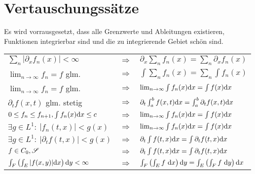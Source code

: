 \section{Vertauschungssätze}



Es wird vorrausgesetzt, dass alle Grenzwerte und Ableitungen existieren, Funktionen integrierbar sind und die zu integrierende Gebiet schön sind.
\begin{adjustbox}{angle=0}
  \fontsize{8}{10}\selectfont
  \centering
  \begin{tabular}{lcl}
     $\sum_n |\partial_x f_n(x)| < \infty$ & $\Rightarrow$ & $\partial_x \sum_n f_n(x) = \sum_n \partial_x f_n(x)$\\
     $\lim_{n\rightarrow\infty} f_n = f$ glm. & $\Rightarrow$ & $\int \sum_n f_n(x) = \sum_n \int f_n(x)$\\
     $\lim_{n\rightarrow\infty} f_n = f$ glm. & $\Rightarrow$ & $\lim_{n\rightarrow\infty}\int f_n(x)\mathrm{d}x = \int f(x)\mathrm{d}x$ \\
     $\partial_tf(x,t)$ glm. stetig & $\Rightarrow$ & $\partial_t\int_a^b f(x,t)\mathrm{d}x = \int_a^b \partial_t f(x,t)\mathrm{d}x$\\
     $0\leq f_n\leq f_{n+1}, \int f_n(x)\mathrm{d}x \leq c$ & $\Rightarrow$ & $\lim_{n\rightarrow\infty} \int f_n(x)\mathrm{d}x = \int f(x)\mathrm{d}x$ \\
     $\exists g\in L^1:\ |f_n(t,x)| < g(x)$ & $\Rightarrow$ & $\lim_{n\rightarrow\infty} \int f_n(x)\mathrm{d}x = \int f(x)\mathrm{d}x$ \\
     $\exists g\in L^1:\ |\partial_tf(t,x)| < g(x)$ & $\Rightarrow$ & $\partial_t\int f(t,x)\mathrm{d}x = \int \partial_tf(t,x)\mathrm{d}x $ \\
     $f\in C_0,\mathscr{S}$ & $\Rightarrow$ & $\partial_t\int f(t,x)\mathrm{d}x = \int \partial_tf(t,x)\mathrm{d}x $ \\
     $\int_F\left(\int_E|f(x,y)|\mathrm{d}x\right)\mathrm{d} y<\infty$ & $\Rightarrow$ & $\int_F\left(\int_E f\ \mathrm{d}x\right)\mathrm{d} y=\int_E\left(\int_F f\ \mathrm{d} y\right)\mathrm{d} x$ \\
  \end{tabular}
\end{adjustbox}

